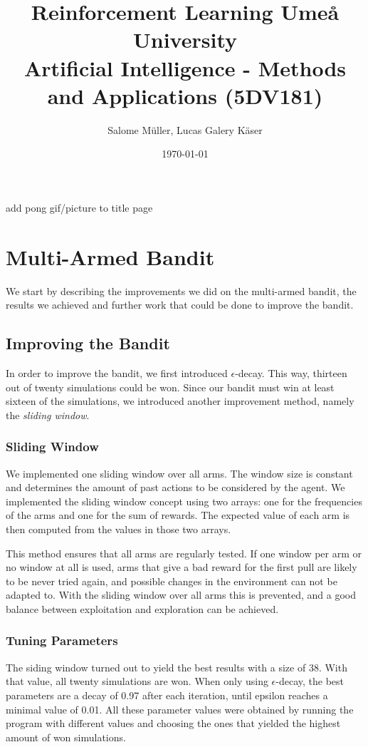 \documentclass[10pt]{article}
\title{
    Reinforcement Learning
    \vspace{3em}
    {\large Umeå University \\
    Artificial Intelligence - Methods and Applications (5DV181)}
    \vspace{3em}
}
\author{Salome Müller, Lucas Galery Käser}
\date{\today}
\newcommand{\todo}[1]{{\color{red}#1}}
\begin{document}
\maketitle

\todo{add pong gif/picture to title page}

\pagebreak

\section{Multi-Armed Bandit}\label{sec:mab}
We start by describing the improvements we did on the multi-armed bandit, the results we achieved and further work that could be done to improve the bandit.

\subsection{Improving the Bandit}\label{subsec:improving-the-bandit}
In order to improve the bandit, we first introduced $\epsilon$-decay.
This way, thirteen out of twenty simulations could be won.
Since our bandit must win at least sixteen of the simulations, we introduced another improvement method, namely the \textit{sliding window}.

\subsubsection{Sliding Window}
We implemented one sliding window over all arms.
The window size is constant and determines the amount of past actions to be considered by the agent.
We implemented the sliding window concept using two arrays: one for the frequencies of the arms and one for the sum of rewards.
The expected value of each arm is then computed from the values in those two arrays.

This method ensures that all arms are regularly tested.
If one window per arm or no window at all is used, arms that give a bad reward for the first pull are likely to be never tried again, and possible changes in the environment can not be adapted to.
With the sliding window over all arms this is prevented, and a good balance between exploitation and exploration can be achieved.

\subsubsection{Tuning Parameters}
The siding window turned out to yield the best results with a size of 38.
With that value, all twenty simulations are won.
When only using $\epsilon$-decay, the best parameters are a decay of 0.97 after each iteration, until epsilon reaches a minimal value of 0.01.
All these parameter values were obtained by running the program with different values and choosing the ones that yielded the highest amount of won simulations.
\end{document}
